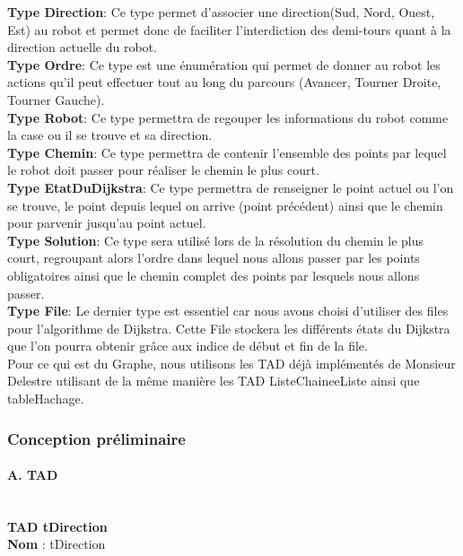 \documentclass[11pt,a4paper]{article}
\begin{document}
\textbf{Type Direction}:
Ce type permet d'associer une direction(Sud, Nord, Ouest, Est) au robot et permet donc de faciliter l'interdiction des demi-tours quant à la direction actuelle du robot.\\

\textbf{Type Ordre}: 
Ce type est une énumération qui permet de donner au robot les actions qu'il peut effectuer tout au long du parcours (Avancer, Tourner Droite, Tourner Gauche).\\

\textbf{Type Robot}: 
Ce type permettra de regouper les informations du robot comme la case ou il se trouve et sa direction.\\

\textbf{Type Chemin}: 
Ce type permettra de contenir l'ensemble des points par lequel le robot doit passer pour réaliser le chemin le plus court.\\

\textbf{Type EtatDuDijkstra}: 
Ce type permettra de renseigner le point actuel ou l'on se trouve, le point depuis lequel on arrive (point précédent) ainsi que le chemin pour parvenir jusqu'au point actuel.\\

\textbf{Type Solution}: 
Ce type sera utilisé lors de la résolution du chemin le plus court, regroupant alors l'ordre dans lequel nous allons passer par les points obligatoires ainsi que le chemin complet des points par lesquels nous allons passer.\\

\textbf{Type File}: 
Le dernier type est essentiel car nous avons choisi d'utiliser des files pour l'algorithme de Dijkstra. Cette File stockera les différents états du Dijkstra que l'on pourra obtenir grâce aux indice de début et fin de la file.\\

Pour ce qui est du Graphe, nous utilisons les TAD déjà implémentés de Monsieur Delestre utilisant de la même manière les TAD ListeChaineeListe ainsi que tableHachage.

\subsubsection{Conception préliminaire}

\paragraph{A. TAD} \mbox{} \\[5pt] 
\textbf{TAD tDirection}\\
\noindent\textbf{Nom} : tDirection
\end{document}
